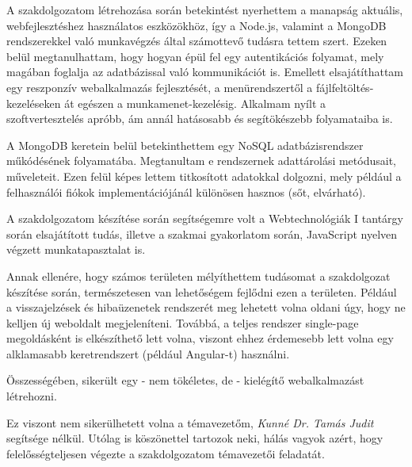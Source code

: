 
A szakdolgozatom létrehozása során betekintést nyerhettem a manapság aktuális, webfejlesztéshez használatos eszközökhöz, így a Node.js, valamint a MongoDB rendszerekkel való munkavégzés által számottevő tudásra tettem szert. Ezeken belül megtanulhattam, hogy hogyan épül fel egy autentikációs folyamat, mely magában foglalja az adatbázissal való kommunikációt is. Emellett elsajátíthattam egy reszponzív webalkalmazás fejlesztését, a menürendszertől a fájlfeltöltés-kezeléseken át egészen a munkamenet-kezelésig. Alkalmam nyílt a szoftvertesztelés apróbb, ám annál hatásosabb és segítökészebb folyamataiba is.

A MongoDB keretein belül betekinthettem egy NoSQL adatbázisrendszer műkódésének folyamatába. Megtanultam e rendszernek adattárolási metódusait, műveleteit. Ezen felül képes lettem titkosított adatokkal dolgozni, mely például a felhasználói fiókok implementációjánál különösen hasznos (sőt, elvárható).

A szakdolgozatom készítése során segítségemre volt a Webtechnológiák I tantárgy során elsajátított tudás, illetve a szakmai gyakorlatom során, JavaScript nyelven végzett munkatapasztalat is.

Annak ellenére, hogy számos területen mélyíthettem tudásomat a szakdolgozat készítése során, természetesen van lehetőségem fejlődni ezen a területen. Például a visszajelzések és hibaüzenetek rendszerét meg lehetett volna oldani úgy, hogy ne kelljen új weboldalt megjeleníteni. Továbbá, a teljes rendszer single-page megoldásként is elkészíthető lett volna, viszont ehhez érdemesebb lett volna egy alklamasabb keretrendszert (például Angular-t) használni.

Összességében, sikerült egy - nem tökéletes, de - kielégítő webalkalmazást létrehozni.

Ez viszont nem sikerülhetett volna a témavezetőm, \textit{Kunné Dr. Tamás Judit} segítsége nélkül. Utólag is köszönettel tartozok neki, hálás vagyok azért, hogy felelősségteljesen végezte a szakdolgozatom témavezetői feladatát.
